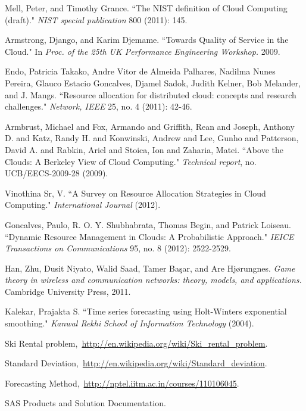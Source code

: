 \documentclass[conference]{IEEEtran}
\begin{document}
\begin{thebibliography}{1}

 Mell, Peter, and Timothy Grance. ``The NIST definition of Cloud Computing (draft)." \emph{NIST special publication} 800 (2011): 145.

 Armstrong, Django, and Karim Djemame. ``Towards Quality of Service in the Cloud." In \emph{Proc. of the 25th UK Performance Engineering Workshop.} 2009.

 Endo, Patricia Takako, Andre Vitor de Almeida Palhares, Nadilma Nunes Pereira, Glauco Estacio Goncalves, Djamel Sadok, Judith Kelner, Bob Melander, and J. Mangs. ``Resource allocation for distributed cloud: concepts and research challenges." \emph{Network, IEEE} 25, no. 4 (2011): 42-46.

 Armbrust, Michael and Fox, Armando and Griffith, Rean and Joseph, Anthony D. and Katz, Randy H. and Konwinski, Andrew and Lee, Gunho and Patterson, David A. and Rabkin, Ariel and Stoica, Ion and Zaharia, Matei. ``Above the Clouds: A Berkeley View of Cloud Computing." \emph{Technical report}, no. UCB/EECS-2009-28 (2009).

 Vinothina Sr, V. ``A Survey on Resource Allocation Strategies in Cloud Computing." \emph{International Journal} (2012).

 Goncalves, Paulo, R. O. Y. Shubhabrata, Thomas Begin, and Patrick Loiseau. ``Dynamic Resource Management in Clouds: A Probabilistic Approach." \emph{IEICE Transactions on Communications} 95, no. 8 (2012): 2522-2529.

 Han, Zhu, Dusit Niyato, Walid Saad, Tamer Başar, and Are Hjørungnes. \emph{Game theory in wireless and communication networks: theory, models, and applications.} Cambridge University Press, 2011.

 Kalekar, Prajakta S. ``Time series forecasting using Holt-Winters exponential smoothing." \emph{Kanwal Rekhi School of Information Technology} (2004).

 Ski Rental problem,\ \url{http://en.wikipedia.org/wiki/Ski_rental_problem}.

 Standard Deviation,\ \url{http://en.wikipedia.org/wiki/Standard_deviation}.

 Forecasting Method,\ \url{http://nptel.iitm.ac.in/courses/110106045}.

 SAS Products and Solution Documentation.

\end{thebibliography}


\end{document}
